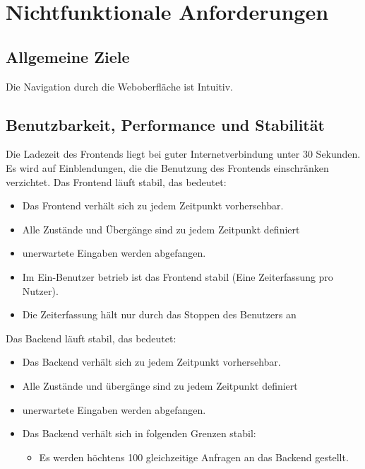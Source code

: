 \section{Nichtfunktionale Anforderungen}

\subsection{Allgemeine Ziele}
\begin{requirements}
     Die Navigation durch die Weboberfläche ist Intuitiv.
\end{requirements}

\subsection{Benutzbarkeit, Performance und Stabilität}
\begin{requirements}
     Die Ladezeit des Frontends liegt bei guter Internetverbindung unter 30 Sekunden.
     Es wird auf Einblendungen, die die Benutzung des Frontends einschränken verzichtet.
     Das Frontend läuft stabil, das bedeutet:
     \begin{itemize}
        \item Das Frontend verhält sich zu jedem Zeitpunkt vorhersehbar.
        \item Alle Zustände und Übergänge sind zu jedem Zeitpunkt definiert
        \item unerwartete Eingaben werden abgefangen.
        \item Im Ein-Benutzer betrieb ist das Frontend stabil (Eine Zeiterfassung pro Nutzer).
        \item Die Zeiterfassung hält nur durch das Stoppen des Benutzers an %
     \end{itemize}
      Das Backend läuft stabil, das bedeutet:
          \begin{itemize}
             \item Das Backend verhält sich zu jedem Zeitpunkt vorhersehbar.
             \item Alle Zustände und übergänge sind zu jedem Zeitpunkt definiert
             \item unerwartete Eingaben werden abgefangen.
             \item Das Backend verhält sich in folgenden Grenzen stabil:
	\begin{itemize}
                    \item Es werden höchtens 100 gleichzeitige Anfragen an das Backend gestellt.
                \end{itemize}
          \end{itemize}
\end{requirements}

